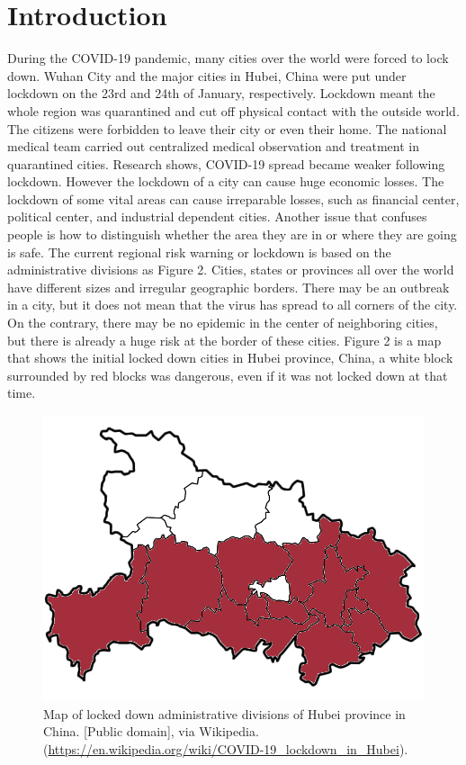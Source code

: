 \documentclass[sigplan,screen]{acmart}
\begin{document}
\maketitle
\section{Introduction}
During the COVID-19 pandemic, many cities over the world were forced to lock down.
Wuhan City and the major cities in Hubei, China were put under lockdown on the 23rd and 24th of January, respectively\cite{lau2020positive}.
Lockdown meant the whole region was quarantined and cut off physical contact with the outside world.
The citizens were forbidden to leave their city or even their home.
The national medical team carried out centralized medical observation and treatment in quarantined cities.
Research shows, COVID-19 spread became weaker following lockdown\cite{lau2020positive}.
However the lockdown of a city can cause huge economic losses.
The lockdown of some vital areas can cause irreparable losses, such as financial center, political center, and industrial dependent cities.
Another issue that confuses people is how to distinguish whether the area they are in or where they are going is safe.
The current regional risk warning or lockdown is based on the administrative divisions as Figure 2.
Cities, states or provinces all over the world have different sizes and irregular geographic borders.
There may be an outbreak in a city, but it does not mean that the virus has spread to all corners of the city.
On the contrary, there may be no epidemic in the center of neighboring cities, but there is already a huge risk at the border of these cities.
Figure 2 is a map that shows the initial locked down cities in Hubei province, China, a white block surrounded by red blocks was dangerous, even if it was not locked down at that time.
\begin{figure}[htb]
	\centering
	\includegraphics[width=\linewidth]{hubei.png}
	\caption{Map of locked down administrative divisions of Hubei province in China. [Public domain], via Wikipedia. (\url{https://en.wikipedia.org/wiki/COVID-19_lockdown_in_Hubei}).}
\end{figure}
\end{document}
